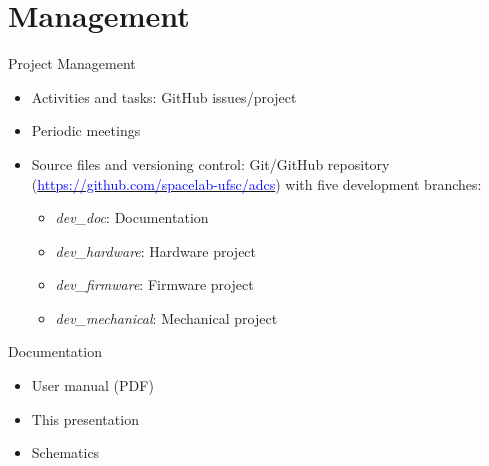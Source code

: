 \documentclass{beamer}
\begin{document}
    \section{Management}

        
        
\begin{frame}{Project Management}

    \begin{itemize}
        \item Activities and tasks: GitHub issues/project
        \vspace{0.25cm}
        \item Periodic meetings
        \vspace{0.25cm}
        \item Source files and versioning control: Git/GitHub repository (\href{https://github.com/spacelab-ufsc/adcs}{\textcolor{blue}{https://github.com/spacelab-ufsc/adcs}}) with five development branches:
            \begin{itemize}
                \item \textit{dev\_doc}: Documentation
                \item \textit{dev\_hardware}: Hardware project
                \item \textit{dev\_firmware}: Firmware project
                \item \textit{dev\_mechanical}: Mechanical project
            \end{itemize}
    \end{itemize}

\end{frame}
        
\begin{frame}{Documentation}

    \begin{itemize}
        \item User manual (PDF)
        \vspace{0.4cm}
        \item This presentation
        \vspace{0.4cm}
        \item Schematics
        \vspace{0.4cm}
    \end{itemize}

\end{frame}
\end{document}
